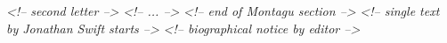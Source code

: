 \begin{shaded}
\hspace*{1em}\hspace*{1em}\hspace*{1em}\mbox{}\newline 
\textit{<!-- second letter -->}\mbox{}\newline 
\hspace*{1em}\hspace*{1em}\hspace*{1em}\mbox{}\newline 
\textit{<!-- ... -->}\mbox{}\newline 
\hspace*{1em}\hspace*{1em}\mbox{}\newline 
\textit{<!-- end of Montagu section -->}\mbox{}\newline 
\hspace*{1em}\hspace*{1em}\mbox{}\newline 
\textit{<!-- single text by Jonathan Swift starts -->}\mbox{}\newline 
\hspace*{1em}\hspace*{1em}\hspace*{1em}\mbox{}\newline 
\textit{<!-- biographical notice by editor -->}\mbox{}\newline 
\hspace*{1em}\hspace*{1em}\hspace*{1em}\mbox{}\newline 
\hspace*{1em}\hspace*{1em}\hspace*{1em}\mbox{}\newline 
\hspace*{1em}\hspace*{1em}\mbox{}\newline 

\end{shaded}

